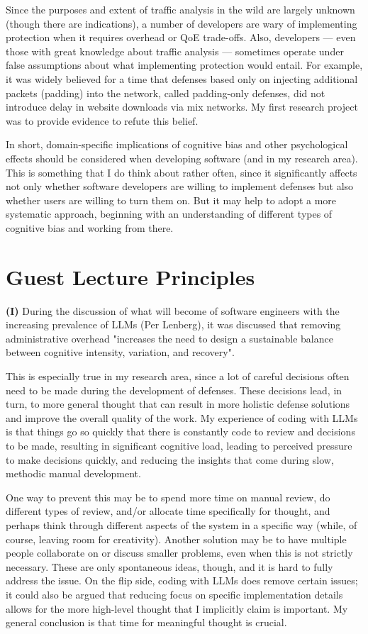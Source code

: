 \documentclass[11pt]{article}
\begin{document}
Since the purposes and extent of traffic analysis in the wild are largely unknown (though there are indications), a number of developers are wary of implementing protection when it requires overhead or QoE trade-offs. Also, developers --- even those with great knowledge about traffic analysis --- sometimes operate under false assumptions about what implementing protection would entail. For example, it was widely believed for a time that defenses based only on injecting additional packets (padding) into the network, called padding-only defenses, did not introduce delay in website downloads via mix networks. My first research project was to provide evidence to refute this belief.

In short, domain-specific implications of cognitive bias and other psychological effects should be considered when developing software (and in my research area). This is something that I do think about rather often, since it significantly affects not only whether software developers are willing to implement defenses but also whether users are willing to turn them on. But it may help to adopt a more systematic approach, beginning with an understanding of different types of cognitive bias and working from there.

\section{Guest Lecture Principles}

\textbf{(I)} During the discussion of what will become of software engineers with the increasing prevalence of LLMs (Per Lenberg), it was discussed that removing administrative overhead "increases the need to design a sustainable balance between cognitive intensity, variation, and recovery".

This is especially true in my research area, since a lot of careful decisions often need to be made during the development of defenses. These decisions lead, in turn, to more general thought that can result in more holistic defense solutions and improve the overall quality of the work. My experience of coding with LLMs is that things go so quickly that there is constantly code to review and decisions to be made, resulting in significant cognitive load, leading to perceived pressure to make decisions quickly, and reducing the insights that come during slow, methodic manual development.

One way to prevent this may be to spend more time on manual review, do different types of review, and/or allocate time specifically for thought, and perhaps think through different aspects of the system in a specific way (while, of course, leaving room for creativity). Another solution may be to have multiple people collaborate on or discuss smaller problems, even when this is not strictly necessary. These are only spontaneous ideas, though, and it is hard to fully address the issue. On the flip side, coding with LLMs does remove certain issues; it could also be argued that reducing focus on specific implementation details allows for the more high-level thought that I implicitly claim is important. My general conclusion is that time for meaningful thought is crucial. \hfill \\
\end{document}
